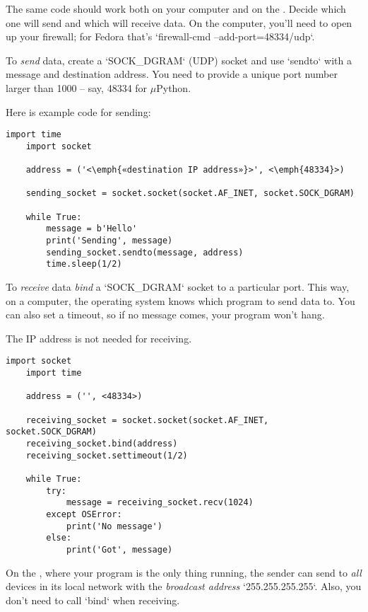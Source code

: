 \documentclass{../tutorial}
\begin{document}
\begin{enumerate}
    The same code should work both on your computer and on the .
    Decide which one will send and which will receive data.
    On the computer, you'll need to open up your firewall; for Fedora that's
    `firewall-cmd --add-port=48334/udp`.

    To \emph{send} data, create a `SOCK_DGRAM` (UDP) socket and use `sendto`
    with a message and destination address.
    You need to provide a unique port number larger than 1000 – say, 48334
    for $\mu$Python.

    Here is example code for sending:

    \begin{lstlisting}[escapeinside=<>]
    import time
    import socket

    address = ('<\emph{«destination IP address»}>', <\emph{48334}>)

    sending_socket = socket.socket(socket.AF_INET, socket.SOCK_DGRAM)

    while True:
        message = b'Hello'
        print('Sending', message)
        sending_socket.sendto(message, address)
        time.sleep(1/2)
    \end{lstlisting}

    To \emph{receive} data \emph{bind} a `SOCK_DGRAM` socket to a particular
    port.
    This way, on a computer, the operating system knows which program to send
    data to.
    You can also set a timeout, so if no message comes, your program won't hang.

    The IP address is not needed for receiving.

    \begin{lstlisting}[escapeinside=<>]
    import socket
    import time

    address = ('', <48334>)

    receiving_socket = socket.socket(socket.AF_INET, socket.SOCK_DGRAM)
    receiving_socket.bind(address)
    receiving_socket.settimeout(1/2)

    while True:
        try:
            message = receiving_socket.recv(1024)
        except OSError:
            print('No message')
        else:
            print('Got', message)
    \end{lstlisting}

    On the , where your program is the only thing running,
    the sender can send to \emph{all} devices in its local network with the
    \emph{broadcast address} `255.255.255.255`.
    Also, you don't need to call `bind` when receiving.


\end{enumerate}
\end{document}

